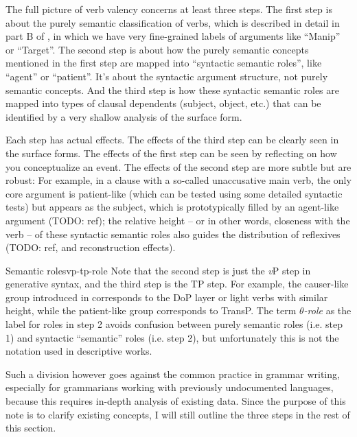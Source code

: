 \documentclass[UTF8, a4paper, oneside, scheme=plain]{ctexrep}
\newcommand*{\term}[1]{\emph{#1}}
\newcommand{\vP}{\textit{v}P}
\begin{document}
The full picture of verb valency concerns at least three steps.
The first step is about the purely semantic classification of verbs,
which is described in detail in part B of \citet{dixon2005semantic},
in which we have very fine-grained labels of arguments like ``Manip'' or ``Target''.
The second step is about how the purely semantic concepts mentioned in the first step 
are mapped into ``syntactic semantic roles'',
like ``agent'' or ``patient''.
It's about the syntactic argument structure, 
not purely semantic concepts.
And the third step is how these syntactic semantic roles are mapped into 
types of clausal dependents (subject, object, etc.) 
that can be identified by a very shallow analysis of the surface form.

Each step has actual effects.
The effects of the third step can be clearly seen in the surface forms.
The effects of the first step can be seen by reflecting on how you conceptualize an event.
The effects of the second step are more subtle but are robust:
For example, in a clause with a so-called unaccusative main verb,
the only core argument is patient-like (which can be tested using some detailed syntactic tests)
but appears as the subject,
which is prototypically filled by an agent-like argument (TODO: ref);
the relative height -- or in other words, closeness with the verb -- of these syntactic semantic roles 
also guides the distribution of reflexives (TODO: ref, and reconstruction effects).

\begin{theorybox}{Semantic roles}{vp-tp-role}
    Note that the second step is just the \vP{} step in generative syntax,
    and the third step is the TP step.
    For example, the causer-like group introduced in 
    corresponds to the DoP layer or light verbs with similar height,
    while the patient-like group corresponds to TransP.
    The term \term{$\theta$-role} as the label for roles in step 2 avoids confusion 
    between purely semantic roles (i.e. step 1) and syntactic ``semantic'' roles (i.e. step 2),
    but unfortunately this is not the notation used in descriptive works.
\end{theorybox}

Such a division however goes against the common practice in grammar writing,
especially for grammarians working with previously undocumented languages,
because this requires in-depth analysis of existing data.
Since the purpose of this note is to clarify existing concepts,
I will still outline the three steps in the rest of this section.
\end{document}
